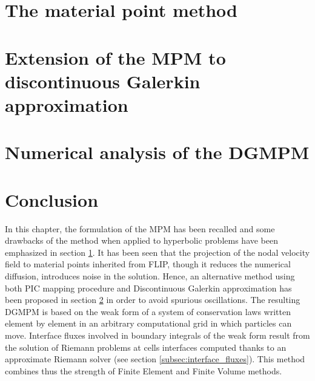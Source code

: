 \section{The material point method}
\label{sec:MPM}


\section{Extension of the MPM to discontinuous Galerkin approximation}
\label{sec:DGMPM}


\section{Numerical analysis of the DGMPM}
\label{sec:DGMPM_analysis}


\section*{Conclusion}
In this chapter, the formulation of the MPM has been recalled and some drawbacks of the method when applied to hyperbolic problems have been emphasized in section \ref{sec:MPM}. It has been seen that the projection of the nodal velocity field to material points inherited from FLIP, though it reduces the numerical diffusion, introduces noise in the solution.
Hence, an alternative method using both PIC mapping procedure and Discontinuous Galerkin approximation has been proposed in section \ref{sec:DGMPM} in order to avoid spurious oscillations.
The resulting DGMPM is based on the weak form of a system of conservation laws written element by element in an arbitrary computational grid in which particles can move. Interface fluxes involved in boundary integrals of the weak form result from the solution of Riemann problems at cells interfaces computed thanks to an approximate Riemann solver (see section \ref{subsec:interface_fluxes}). This method combines thus the strength of Finite Element and Finite Volume methods.


